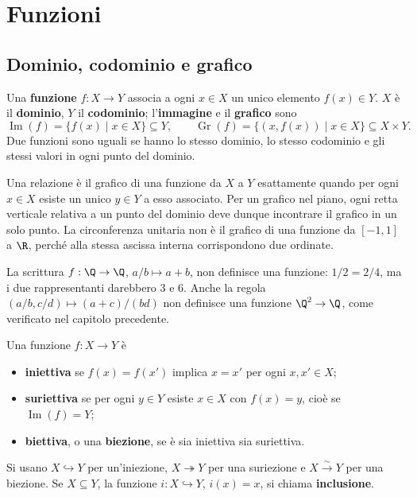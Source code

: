 \chapter{Funzioni}

\section{Dominio, codominio e grafico}
\begin{definizione}
Una \textbf{funzione} $f:X\to Y$ associa a ogni $x\in X$ un unico elemento $f(x)\in Y$. $X$ è il \textbf{dominio}, $Y$ il \textbf{codominio}; l'\textbf{immagine} e il \textbf{grafico} sono
\[
\operatorname{Im}(f)=\{f(x)\mid x\in X\}\subseteq Y,
\qquad \operatorname{Gr}(f)=\{(x,f(x))\mid x\in X\}\subseteq X\times Y.
\]
Due funzioni sono uguali se hanno lo stesso dominio, lo stesso codominio e gli stessi valori in ogni punto del dominio.
\end{definizione}

Una relazione è il grafico di una funzione da $X$ a $Y$ esattamente quando per ogni $x\in X$ esiste un unico $y\in Y$ a esso associato. Per un grafico nel piano, ogni retta verticale relativa a un punto del dominio deve dunque incontrare il grafico in un solo punto. La circonferenza unitaria non è il grafico di una funzione da $[-1,1]$ a $\R$, perché alla stessa ascissa interna corrispondono due ordinate.

\begin{esempio}
La scrittura $f:\Q\to\Q$, $a/b\mapsto a+b$, non definisce una funzione: $1/2=2/4$, ma i due rappresentanti darebbero $3$ e $6$. Anche la regola $(a/b,c/d)\mapsto(a+c)/(bd)$ non definisce una funzione $\Q^2\to\Q$, come verificato nel capitolo precedente.
\end{esempio}

\begin{definizione}
Una funzione $f:X\to Y$ è
\begin{itemize}
  \item \textbf{iniettiva} se $f(x)=f(x')$ implica $x=x'$ per ogni $x,x'\in X$;
  \item \textbf{suriettiva} se per ogni $y\in Y$ esiste $x\in X$ con $f(x)=y$, cioè se $\operatorname{Im}(f)=Y$;
  \item \textbf{biettiva}, o una \textbf{biezione}, se è sia iniettiva sia suriettiva.
\end{itemize}
Si usano $X\hookrightarrow Y$ per un'iniezione, $X\twoheadrightarrow Y$ per una suriezione e $X\xrightarrow{\sim}Y$ per una biezione. Se $X\subseteq Y$, la funzione $i:X\hookrightarrow Y$, $i(x)=x$, si chiama \textbf{inclusione}.
\end{definizione}

